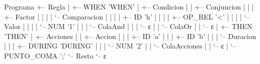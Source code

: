 Programa
+-- Regla
|   +-- WHEN 'WHEN'
|   +-- Condicion
|   |   +-- Conjuncion
|   |   |   +-- Factor
|   |   |   |   `-- Comparacion
|   |   |   |       +-- ID 'h'
|   |   |   |       +-- OP_REL '<'
|   |   |   |       `-- Valor
|   |   |   |           `-- NUM '1'
|   |   |   `-- ColaAnd
|   |   |       `-- ε
|   |   `-- ColaOr
|   |       `-- ε
|   +-- THEN 'THEN'
|   +-- Acciones
|   |   +-- Accion
|   |   |   +-- ID 'a'
|   |   |   +-- ID 'b'
|   |   |   `-- Duracion
|   |   |       +-- DURING 'DURING'
|   |   |       `-- NUM '2'
|   |   `-- ColaAcciones
|   |       `-- ε
|   `-- PUNTO_COMA ';'
`-- Resto
    `-- ε
